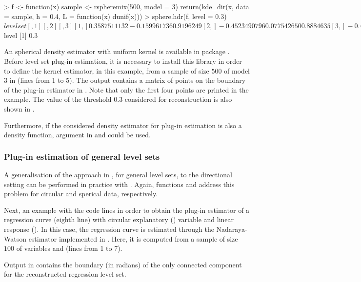 \begin{example}
> f <- function(x){
    sample <- rspheremix(500, model = 3)
    return(kde_dir(x, data = sample, h = 0.4,
     L = function(x) dunif(x)))
    }
> sphere.hdr(f, level = 0.3)
$levelset
                [,1]         [,2]      [,3]
  [1,]  0.3587511132 -0.159961736 0.9196249
  [2,] -0.4523490796  0.077542650 0.8884635
  [3,] -0.4588831000  0.060463844 0.8864369
  [4,]  0.2455354599 -0.291602658 0.9244892
$level
[1] 0.3
\end{example}
An spherical density estimator with uniform kernel is available in package . Before level set plug-in estimation, it is necessary to install this library in order to define the kernel estimator, in this example, from a sample of size $500$ of model 3 in  (lines from 1 to 5).  The output contains a matrix of points on the boundary of the plug-in estimator in . Note that only the first four points are printed in the example. The value of the threshold $0.3$ considered for reconstruction is also shown in .

Furthermore, if the considered density estimator for plug-in estimation is also a density function, argument  in  and  could be used.


\subsubsection{Plug-in estimation of general level sets}


A generalisation of the approach in \cite{cuevas2006plug}, for general level sets, to the directional setting can be performed in practice with . Again, functions  and  address this problem for circular and sperical data, respectively.

Next, an example with the code lines in order to obtain the plug-in estimator of a regression curve (eighth line) with circular explanatory () variable and linear response (). In this case, the regression curve is estimated through the Nadaraya-Watson estimator implemented in . Here, it is computed from a sample of size $100$ of variables  and  (lines from 1 to 7). 
 

Output in  contains the boundary (in radians) of the only connected component for the reconstructed regression level set. 
 
